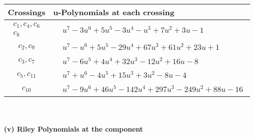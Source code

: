 \documentclass[1p]{elsarticle_modified}
\theoremstyle{definition}
\begin{document}
\begin{tabular}{m{50pt}|m{274pt}}
Crossings & \hspace{64pt}u-Polynomials at each crossing \\
\hline $$\begin{aligned}c_{1},c_{4},c_{6}\\c_{8}\end{aligned}$$&$\begin{aligned}
&u^7-3 u^6+5 u^5-3 u^4- u^3+7 u^2+3 u-1
\end{aligned}$\\
\hline $$\begin{aligned}c_{2},c_{9}\end{aligned}$$&$\begin{aligned}
&u^7- u^6+5 u^5-29 u^4+67 u^3+61 u^2+23 u+1
\end{aligned}$\\
\hline $$\begin{aligned}c_{3},c_{7}\end{aligned}$$&$\begin{aligned}
&u^7-6 u^5+4 u^4+32 u^3-12 u^2+16 u-8
\end{aligned}$\\
\hline $$\begin{aligned}c_{5},c_{11}\end{aligned}$$&$\begin{aligned}
&u^7+u^6-4 u^5+15 u^3+3 u^2-8 u-4
\end{aligned}$\\
\hline $$\begin{aligned}c_{10}\end{aligned}$$&$\begin{aligned}
&u^7-9 u^6+46 u^5-142 u^4+297 u^3-249 u^2+88 u-16
\end{aligned}$\\
\hline
\end{tabular}\\~\\
\newpage\renewcommand{\arraystretch}{1}
\flushleft \textbf{(v) Riley Polynomials at the component}\newline \\
\end{document}
